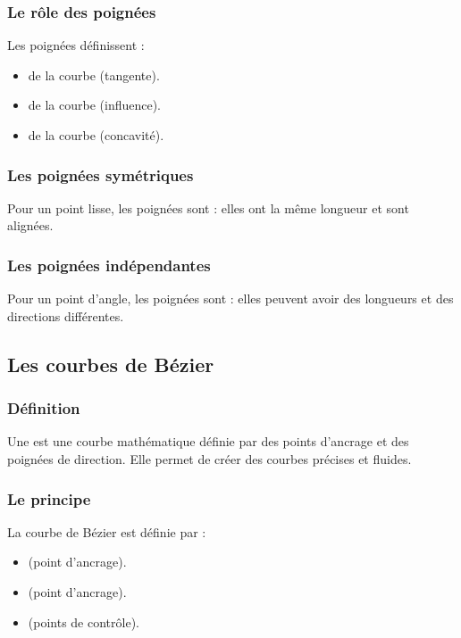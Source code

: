 \subsubsection{Le rôle des poignées}

Les poignées définissent :

\begin{itemize}
    \item {} de la courbe (tangente).
    \item {} de la courbe (influence).
    \item {} de la courbe (concavité).
\end{itemize}

\subsubsection{Les poignées symétriques}

Pour un point lisse, les poignées sont  : elles ont la même longueur et sont alignées.

\subsubsection{Les poignées indépendantes}

Pour un point d'angle, les poignées sont  : elles peuvent avoir des longueurs et des directions différentes.

\subsection{Les courbes de Bézier}

\subsubsection{Définition}

Une  est une courbe mathématique définie par des points d'ancrage et des poignées de direction. Elle permet de créer des courbes précises et fluides.

\subsubsection{Le principe}

La courbe de Bézier est définie par :

\begin{itemize}
    \item {} (point d'ancrage).
    \item {} (point d'ancrage).
    \item {} (points de contrôle).
\end{itemize}

